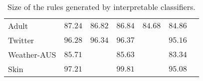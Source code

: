 \begin{table}
\begin{center}
\begin{tabular}{l   r r r r r  r }
			\multirow{1}{*}{ Adult}   & $   87.24  $    & $   86.82  $    & $   86.84  $    & $   84.68  $    & $   84.86  $   \\ 
			\multirow{1}{*}{ Twitter}   & $   96.28  $    & $   96.34  $    & $   96.37  $     &  \multicolumn{1}{c}{\textemdash}      & $   95.16  $   \\ 
			\multirow{1}{*}{ Weather-AUS}   & $   85.71  $     &  \multicolumn{1}{c}{\textemdash}      & $   85.63  $     &  \multicolumn{1}{c}{\textemdash}      & $   83.34  $   \\ 
			\multirow{1}{*}{ Skin}   & $   97.21  $     &  \multicolumn{1}{c}{\textemdash}      & $   99.81  $     &  \multicolumn{1}{c}{\textemdash}      & $   95.08  $   \\ 
			\bottomrule
		\end{tabular}
	\end{center}
	\caption{Size of the rules generated by  interpretable classifiers.}
	\label{tab:rule_size}
\end{table}



